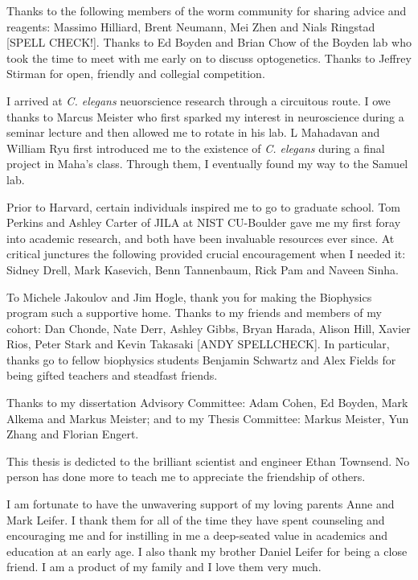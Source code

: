 Thanks to the following members of the worm community for sharing advice and reagents: Massimo Hilliard,  Brent Neumann, Mei Zhen  and Nials Ringstad [SPELL CHECK!]. Thanks to
Ed Boyden and Brian Chow of the Boyden lab who took the time to meet with me early on to discuss optogenetics. Thanks to Jeffrey Stirman for open, friendly and collegial competition. 
 
I arrived at \textit{C. elegans} neuorscience research through a circuitous route. I owe thanks to Marcus Meister who first sparked my interest in neuroscience during a seminar lecture and then allowed me to rotate in his lab. L Mahadavan and William Ryu first introduced me to the existence of \textit{C. elegans} during a final project in Maha's class. Through them, I eventually  found my way to the Samuel lab. 

Prior to Harvard, certain individuals inspired me to go to graduate school. Tom Perkins and Ashley Carter of JILA at NIST CU-Boulder gave me my first foray into  academic research, and both have been invaluable resources ever since. At critical junctures the following provided crucial encouragement when I needed it: Sidney Drell, Mark Kasevich, Benn Tannenbaum, Rick Pam and Naveen Sinha.


To Michele Jakoulov and Jim Hogle, thank you for making the Biophysics program such a supportive home. Thanks to my friends and members of my cohort: Dan Chonde, Nate Derr, Ashley Gibbs, Bryan Harada, Alison Hill, Xavier Rios, Peter Stark  and Kevin Takasaki [ANDY SPELLCHECK]. In particular, thanks go to fellow biophysics students Benjamin Schwartz and Alex Fields for being gifted teachers and steadfast friends.



Thanks to my dissertation Advisory Committee: Adam Cohen, Ed Boyden, Mark Alkema and Markus Meister; and to my Thesis Committee: Markus Meister, Yun Zhang and Florian Engert.

This thesis is dedicted to the brilliant scientist and engineer Ethan Townsend.
No person has done more to  teach me to appreciate the friendship of others.

I am fortunate to have the unwavering support of my loving parents Anne and Mark Leifer. I thank them for all of the time they have spent counseling and encouraging me and for instilling in me a deep-seated value in academics and education at an early age. I also thank my brother Daniel Leifer for being a close friend. I am a product of my family and I love them very much.

